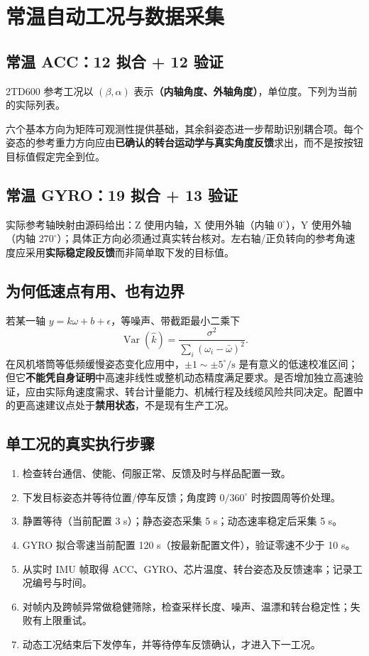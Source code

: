 \chapter{常温自动工况与数据采集}
\section{常温 ACC：12 拟合 + 12 验证}
2TD600 参考工况以 $(\beta,\alpha)$ 表示\textbf{（内轴角度、外轴角度）}，单位度。下列为当前 的实际列表。


六个基本方向为矩阵可观测性提供基础，其余斜姿态进一步帮助识别耦合项。每个姿态的参考重力方向应由\textbf{已确认的转台运动学与真实角度反馈}求出，而不是按按钮目标值假定完全到位。

\section{常温 GYRO：19 拟合 + 13 验证}

实际参考轴映射由源码给出：Z 使用内轴，X 使用外轴（内轴 $0^\circ$），Y 使用外轴（内轴 $270^\circ$）；具体正方向必须通过真实转台核对。左右轴/正负转向的参考角速度应采用\textbf{实际稳定段反馈}而非简单取下发的目标值。

\section{为何低速点有用、也有边界}
若某一轴 $y=k\omega+b+\epsilon$，等噪声、带截距最小二乘下
\begin{equation}
\operatorname{Var}(\hat k)=\frac{\sigma^2}{\sum_i(\omega_i-\bar\omega)^2}.
\end{equation}
在风机塔筒等低频缓慢姿态变化应用中，$\pm1\sim\pm5^\circ/\mathrm{s}$ 是有意义的低速校准区间；但它\textbf{不能凭自身证明}中高速非线性或整机动态精度满足要求。是否增加独立高速验证，应由实际角速度需求、转台计量能力、机械行程及线缆风险共同决定。配置中的更高速建议点处于\textbf{禁用状态}，不是现有生产工况。

\section{单工况的真实执行步骤}
\begin{enumerate}
\item 检查转台通信、使能、伺服正常、反馈及时与样品配置一致。
\item 下发目标姿态并等待位置/停车反馈；角度跨 $0/360^\circ$ 时按圆周等价处理。
\item 静置等待（当前配置 3 s）；静态姿态采集 5 s；动态速率稳定后采集 5 s。
\item GYRO 拟合零速当前配置 120 s（按最新配置文件），验证零速不少于 10 s。
\item 从实时 IMU 帧取得 ACC、GYRO、芯片温度、转台姿态及反馈速率；记录工况编号与时间。
\item 对帧内及跨帧异常做稳健筛除，检查采样长度、噪声、温漂和转台稳定性；失败有上限重试。
\item 动态工况结束后下发停车，并等待停车反馈确认，才进入下一工况。
\end{enumerate}


